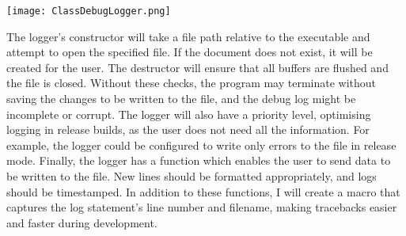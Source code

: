 \FloatBarrier
\begin{figure*}[htp]
	\centering
	\texttt{[image: ClassDebugLogger.png]}
\end{figure*}
\FloatBarrier

The logger's constructor will take a file path relative to the executable and attempt to open the specified file. If the document does not exist, it will be created for the user. The destructor will ensure that all buffers are flushed and the file is closed. Without these checks, the program may terminate without saving the changes to be written to the file, and the debug log might be incomplete or corrupt. The logger will also have a priority level, optimising logging in release builds, as the user does not need all the information. For example, the logger could be configured to write only errors to the file in release mode. Finally, the logger has a function which enables the user to send data to be written to the file. New lines should be formatted appropriately, and logs should be timestamped. In addition to these functions, I will create a macro that captures the log statement's line number and filename, making tracebacks easier and faster during development.

\begin{center}
\end{center}

